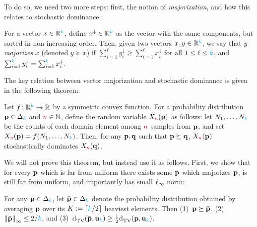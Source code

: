 To do so, we need two more steps: first, the notion of \emph{majorization}, and how this relates to stochastic dominance.
\begin{definition}
For a vector $x\in \R^\ab$, define $x^{\downarrow}\in\R^\ab$ as the vector with the same components, but sorted in non-increasing order. Then, given two vectors $x,y\in\R^\ab$, we say that $y$ \emph{majorizes} $x$ (denoted $y\succeq x$) if $\sum_{i=1}^\ell y^{\downarrow}_i \geq \sum_{i=1}^\ell x^{\downarrow}_i$ for all $1\leq \ell\leq \ab$, and $\sum_{i=1}^\ab y^{\downarrow}_i = \sum_{i=1}^\ab x^{\downarrow}_i$.
\end{definition}
The key relation between vector majorization and stochastic dominance is given in the following theorem:
\begin{theorem}
  \label{theo:stochdominance:symmetricfunction}
  Let $f\colon \R^\ab\to\R$ by a symmetric convex function. For a probability distribution $\p\in\distribs{\ab}$ and $\ns\in\N$, define the random variable $X_\ns(\p)$ as follows: let $N_1,\dots,N_\ab$ be the counts of each domain element among $\ns$ \iid samples from $\p$, and set $X_\ns(\p)=f(N_1,\dots,N_\ab)$. Then, for any $\p,\q$ such that $\p\succeq\q$, $X_\ns(\p)$ stochastically dominates $X_\ns(\q)$.
\end{theorem}
We will not prove this theorem, but instead use it as follows. First, we show that for every $\p$ which is far from uniform there exists some $\bar{\p}$ which majorizes $\p$, is still far from uniform, and importantly has small $\lp[\infty]$ norm: 
\begin{lemma}
  \label{lemma:distance:uniformity:averaging}
For any $\p\in\distribs{\ab}$, let $\bar{\p}\in\distribs{\ab}$ denote the probability distribution obtained by averaging $\p$ over its $K\eqdef \clg{\ab/2}$ heaviest elements. Then (1)~$\p\succeq \bar{\p}$, (2)~$\norminf{\bar{\p}}\leq 2/\ab$, and (3)~$\totalvardist{\bar{\p}}{\uniform_\ab}\geq \frac{1}{2}\totalvardist{\p}{\uniform_\ab}$.
\end{lemma}
